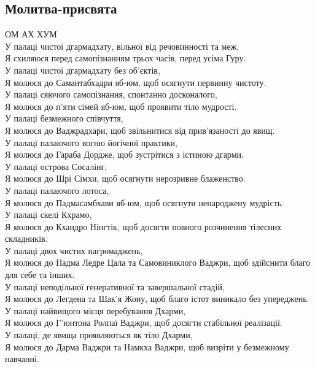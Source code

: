 \documentclass{article}
\begin{document}
\subsection{Молитва-присвята}

ОМ АХ ХУМ \\

\noindent У палаці чистої дгармадхату, вільної від речовинності та меж, \\
Я схиляюся перед самопізнанням трьох часів, перед усіма Гуру. \\
У палаці чистої дгармадхату без об’єктів, \\
Я молюся до Самантабхадри яб-юм, щоб осягнути первинну чистоту. \\
У палаці сяючого самопізнання, спонтанно досконалого, \\
Я молюся до п’яти сімей яб-юм, щоб проявити тіло мудрості. \\
У палаці безмежного співчуття, \\
Я молюся до Ваджрадхари, щоб звільнитися від прив’язаності до явищ. \\
У палаці палаючого вогню йогічної практики, \\
Я молюся до Гараба Дордже, щоб зустрітися з істиною дгарми. \\
У палаці острова Сосалінг, \\
Я молюся до Шрі Сімхи, щоб осягнути нерозривне блаженство. \\
У палаці палаючого лотоса, \\
Я молюся до Падмасамбхави яб-юм, щоб осягнути ненароджену мудрість. \\
У палаці скелі Кхрамо, \\
Я молюся до Кхандро Нінгтік, щоб досягти повного розчинення тілесних складників. \\
У палаці двох чистих нагромаджень, \\
Я молюся до Падма Ледре Цала та Самовиниклого Ваджри, щоб здійснити благо для себе та інших. \\
У палаці неподільної генеративної та завершальної стадій, \\
Я молюся до Легдена та Шак’я Жону, щоб благо істот виникало без упереджень. \\
У палаці найвищого місця перебування Дхарми, \\
Я молюся до Г’юнтона Ролпаї Ваджри, щоб досягти стабільної реалізації. \\
У палаці, де явища проявляються як тіло Дхарми, \\
Я молюся до Дарма Ваджри та Намкха Ваджри, щоб визріти у безмежному навчанні. \\
\end{document}

